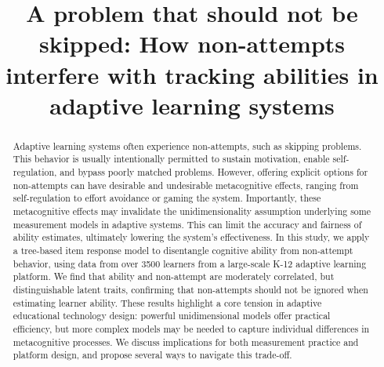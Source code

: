 \documentclass[11pt]{article}
\begin{document}
 


\title{A problem that should not be skipped: How non-attempts interfere with tracking abilities in adaptive learning systems}

\date{}
\maketitle


\begin{abstract}
Adaptive learning systems often experience non-attempts, such as skipping problems. This behavior is usually intentionally permitted to sustain motivation, enable self-regulation, and bypass poorly matched problems. However, offering explicit options for non-attempts can have desirable and undesirable metacognitive effects, ranging from self-regulation to effort avoidance or gaming the system. Importantly, these metacognitive effects may invalidate the unidimensionality assumption underlying some measurement models in adaptive systems. This can limit the accuracy and fairness of ability estimates, ultimately lowering the system's effectiveness. In this study, we apply a tree-based item response model to disentangle cognitive ability from non-attempt behavior, using data from over \num{3500} learners from a large-scale K-12 adaptive learning platform. We find that ability and non-attempt are moderately correlated, but distinguishable latent traits, confirming that non-attempts should not be ignored when estimating learner ability. These results highlight a core tension in adaptive educational technology design: powerful unidimensional models offer practical efficiency, but more complex models may be needed to capture individual differences in metacognitive processes. We discuss implications for both measurement practice and platform design, and propose several ways to navigate this trade-off. 
 
\end{abstract}
\end{document}

